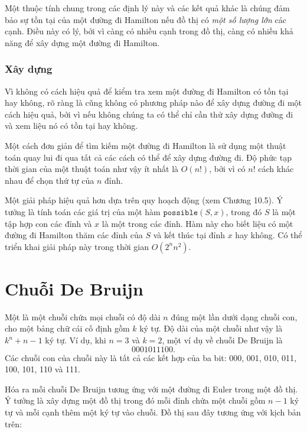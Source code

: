 Một thuộc tính chung trong các định lý này và các kết quả khác là
chúng đảm bảo sự tồn tại của một đường đi Hamilton
nếu đồ thị có \emph{một số lượng lớn} các cạnh.
Điều này có lý, bởi vì càng có nhiều cạnh trong đồ thị,
càng có nhiều khả năng để xây dựng một đường đi Hamilton.

\subsubsection{Xây dựng}

Vì không có cách hiệu quả để kiểm tra xem một đường đi Hamilton
có tồn tại hay không, rõ ràng là cũng không có phương pháp nào
để xây dựng đường đi một cách hiệu quả, bởi vì nếu không
chúng ta có thể chỉ cần thử xây dựng đường đi và xem
liệu nó có tồn tại hay không.

Một cách đơn giản để tìm kiếm một đường đi Hamilton là
sử dụng một thuật toán quay lui đi qua tất cả
các cách có thể để xây dựng đường đi.
Độ phức tạp thời gian của một thuật toán như vậy ít nhất là $O(n!)$,
bởi vì có $n!$ cách khác nhau để chọn thứ tự của $n$ đỉnh.

Một giải pháp hiệu quả hơn dựa trên quy hoạch động
(xem Chương 10.5).
Ý tưởng là tính toán các giá trị
của một hàm $\texttt{possible}(S,x)$,
trong đó $S$ là một tập hợp con các đỉnh và $x$
là một trong các đỉnh.
Hàm này cho biết liệu có một đường đi Hamilton
thăm các đỉnh của $S$ và kết thúc tại đỉnh $x$ hay không.
Có thể triển khai giải pháp này trong thời gian $O(2^n n^2)$.

\section{Chuỗi De Bruijn}


Một 
là một chuỗi chứa
mọi chuỗi có độ dài $n$
đúng một lần dưới dạng chuỗi con, cho một
bảng chữ cái cố định gồm $k$ ký tự.
Độ dài của một chuỗi như vậy là
$k^n+n-1$ ký tự.
Ví dụ, khi $n=3$ và $k=2$,
một ví dụ về chuỗi De Bruijn là
\[0001011100.\]
Các chuỗi con của chuỗi này là tất cả
các kết hợp của ba bit:
000, 001, 010, 011, 100, 101, 110 và 111.

Hóa ra mỗi chuỗi De Bruijn
tương ứng với một đường đi Euler trong một đồ thị.
Ý tưởng là xây dựng một đồ thị trong đó
mỗi đỉnh chứa một chuỗi gồm $n-1$ ký tự
và mỗi cạnh thêm một ký tự vào chuỗi.
Đồ thị sau đây tương ứng với kịch bản trên:

